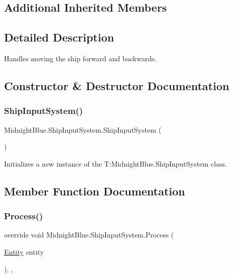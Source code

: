 \subsection*{Additional Inherited Members}


\subsection{Detailed Description}
Handles moving the ship forward and backwards. 



\subsection{Constructor \& Destructor Documentation}
\hypertarget{class_midnight_blue_1_1_ship_input_system_ad7f804f91939a651c8e53ddb6bf55db6}{}\label{class_midnight_blue_1_1_ship_input_system_ad7f804f91939a651c8e53ddb6bf55db6} 
\subsubsection{\texorpdfstring{Ship\+Input\+System()}{ShipInputSystem()}}
{\footnotesize\ttfamily Midnight\+Blue.\+Ship\+Input\+System.\+Ship\+Input\+System (\begin{DoxyParamCaption}{ }\end{DoxyParamCaption})\hspace{0.3cm}{\ttfamily [inline]}}



Initializes a new instance of the T\+:\+Midnight\+Blue.\+Ship\+Input\+System class. 



\subsection{Member Function Documentation}
\hypertarget{class_midnight_blue_1_1_ship_input_system_ac504beb5b6afa47ca4618d9683e46946}{}\label{class_midnight_blue_1_1_ship_input_system_ac504beb5b6afa47ca4618d9683e46946} 
\subsubsection{\texorpdfstring{Process()}{Process()}}
{\footnotesize\ttfamily override void Midnight\+Blue.\+Ship\+Input\+System.\+Process (\begin{DoxyParamCaption}\item[{\hyperlink{class_m_b2_d_1_1_entity_component_1_1_entity}{Entity}}]{entity }\end{DoxyParamCaption})\hspace{0.3cm}{\ttfamily [inline]}, {\ttfamily [protected]}, {\ttfamily [virtual]}}



